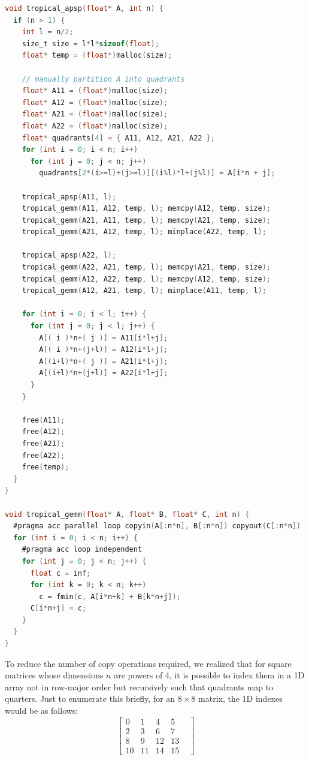 \documentclass[12pt]{article}
\newcommand*{\ttfamilywithbold}{\fontfamily{lmtt}\selectfont}
\begin{document}
\begin{lstlisting}[language=C,basicstyle=\ttfamilywithbold\footnotesize]
void tropical_apsp(float* A, int n) {
  if (n > 1) {
    int l = n/2;
    size_t size = l*l*sizeof(float);
    float* temp = (float*)malloc(size);

    // manually partition A into quadrants
    float* A11 = (float*)malloc(size);
    float* A12 = (float*)malloc(size);
    float* A21 = (float*)malloc(size);
    float* A22 = (float*)malloc(size);
    float* quadrants[4] = { A11, A12, A21, A22 };
    for (int i = 0; i < n; i++)
      for (int j = 0; j < n; j++)
        quadrants[2*(i>=l)+(j>=l)][(i%l)*l+(j%l)] = A[i*n + j];

    tropical_apsp(A11, l);
    tropical_gemm(A11, A12, temp, l); memcpy(A12, temp, size);
    tropical_gemm(A21, A11, temp, l); memcpy(A21, temp, size);
    tropical_gemm(A21, A12, temp, l); minplace(A22, temp, l);

    tropical_apsp(A22, l);
    tropical_gemm(A22, A21, temp, l); memcpy(A21, temp, size);
    tropical_gemm(A12, A22, temp, l); memcpy(A12, temp, size);
    tropical_gemm(A12, A21, temp, l); minplace(A11, temp, l);

    for (int i = 0; i < l; i++) {
      for (int j = 0; j < l; j++) {
        A[( i )*n+( j )] = A11[i*l+j];
        A[( i )*n+(j+l)] = A12[i*l+j];
        A[(i+l)*n+( j )] = A21[i*l+j];
        A[(i+l)*n+(j+l)] = A22[i*l+j];
      }
    }

    free(A11);
    free(A12);
    free(A21);
    free(A22);
    free(temp);
  }
}

void tropical_gemm(float* A, float* B, float* C, int n) {
  #pragma acc parallel loop copyin(A[:n*n], B[:n*n]) copyout(C[:n*n])
  for (int i = 0; i < n; i++) {
    #pragma acc loop independent
    for (int j = 0; j < n; j++) {
      float c = inf;
      for (int k = 0; k < n; k++)
        c = fmin(c, A[i*n+k] + B[k*n+j]);
      C[i*n+j] = c;
    }
  }
}
\end{lstlisting}

To reduce the number of copy operations required, we realized that for square matrices whose dimensions $n$ are powers of 4, it is possible to index them in a 1D array not in row-major order but recursively such that quadrants map to quarters. Just to enumerate this briefly, for an $8 \times 8$ matrix, the 1D indexes would be as follows:
$$
\begin{bmatrix}
  0  & 1  & 4  & 5  & \\
  2  & 3  & 6  & 7  & \\
  8  & 9  & 12 & 13 & \\
  10 & 11 & 14 & 15 &
\end{bmatrix}
$$
\end{document}
